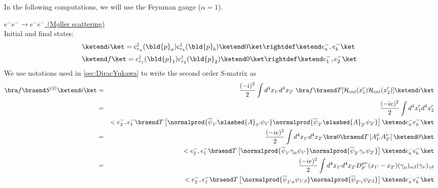 
In the following computations, we will use the Feynman gauge ($\alpha = 1$).
 
\bigskip


\noindent
\underline{$e^- e^- \to e^- e^-$ (M{\o}ller scattering)}\\
Initial and final states:
\begin{eqnarray}
\begin{array}{l}
\ketend i \ket
= c_{r_a}^\dagger (\bld{p}_a) c_{r_b}^\dagger (\bld{p}_b) \ketend 0 \ket
\rightdef \ketend e^-_a, e^-_b \ket
\vspace{2mm}
\\
\ketend f \ket
= c_{r_1}^\dagger (\bld{p}_1) c_{r_2}^\dagger (\bld{p}_2) \ketend 0 \ket
\rightdef \ketend e^-_1, e^-_2 \ket
\end{array}
\end{eqnarray}
We use notations used in \ref{sec:DiracYukawa} to write
the second order S-matrix as
\begin{eqnarray}
\bra f \braend S^{(2)} \ketend i \ket
&=&
\frac{(-i)^2}{2}
\int d^4 x_{1'} d^4 x_{2'}
\;\bra f \braend T[ {\cal H}_{int}(x_1') {\cal H}_{int}(x_2')] \ketend i \ket
\nonumber\\
&=&
\frac{(-ie)^2}{2}
\int d^4 x_1' d^4 x_2'
\nonumber\\
&&
<e^-_2, e^-_1 \braend T \left[
\normalprod{
\overline{\psi}_{1'}
\slashed{A}_{1'} \psi_{1'}
}
\normalprod{
\overline{\psi}_{2'}
\slashed{A}_{2'} \psi_{2'}
}
\right]
\ketend e^-_a e^-_b \ket
\nonumber\\
&=&
\frac{(-ie)^2}{2}
\int d^4 x_{1'} d^4 x_{2'}
\bra 0 \braend T\left[
A_{1'}^\mu A_{2'}^\nu
\right] \ketend 0 \ket
\nonumber\\
&&
<e^-_2, e^-_1 \braend T \left[
\normalprod{
\overline{\psi}_{1'}
\gamma_\mu \psi_{1'}
}
\normalprod{
\overline{\psi}_{2'}
\gamma_\nu \psi_{2'}
}
\right]
\ketend e^-_a e^-_b \ket
\nonumber\\
&=&
\frac{(-ie)^2}{2}
\int d^4 x_{1'} d^4 x_{2'}
D_F^{\mu \nu}(x_{1'} - x_{2'}) 
(\gamma_\mu)_{\alpha \beta}
(\gamma_\nu)_{\gamma \delta} 
\nonumber\\
&&
<e^-_2, e^-_1 \braend T \left[
\normalprod{
\overline{\psi}_{1' \alpha}
 \psi_{1' \beta}
}
\normalprod{
\overline{\psi}_{2' \gamma}
\psi_{2' \delta}
}
\right]
\ketend e^-_a e^-_b \ket
\nonumber\\
\label{eqn:SmatrixMoller1}
\end{eqnarray}
